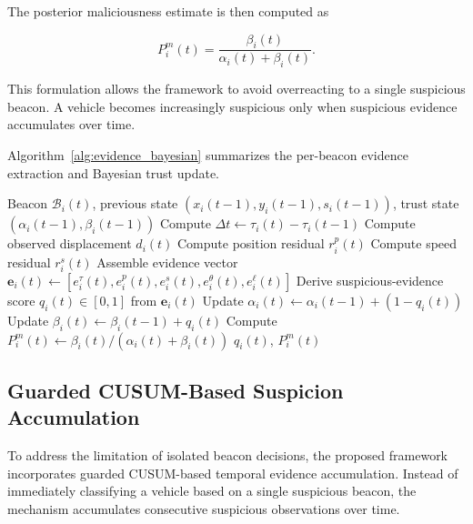\documentclass[journal]{IEEEtran}
\begin{document}
The posterior maliciousness estimate is then computed as

\begin{equation}
P_i^{m}(t)=\frac{\beta_i(t)}{\alpha_i(t)+\beta_i(t)}.
\label{eq:malicious_probability}
\end{equation}

This formulation allows the framework to avoid overreacting to a single suspicious beacon. A vehicle becomes increasingly suspicious only when suspicious evidence accumulates over time.

Algorithm~\ref{alg:evidence_bayesian} summarizes the per-beacon evidence extraction and Bayesian trust update.

\begin{algorithm}[!t]
\caption{Physical-Consistency Evidence Extraction and Bayesian Trust Update}
\label{alg:evidence_bayesian}
\begin{algorithmic}[1]
\REQUIRE Beacon $\mathcal{B}_i(t)$, previous state $(x_i(t-1),y_i(t-1),s_i(t-1))$, trust state $(\alpha_i(t-1),\beta_i(t-1))$
\STATE Compute $\Delta t \leftarrow \tau_i(t)-\tau_i(t-1)$
\STATE Compute observed displacement $d_i(t)$ 
\STATE Compute position residual $r_i^{p}(t)$ 
\STATE Compute speed residual $r_i^{s}(t)$ 
\STATE Assemble evidence vector $\mathbf{e}_i(t) \leftarrow [e_i^{\tau}(t),e_i^{p}(t),e_i^{s}(t),e_i^{\theta}(t),e_i^{\ell}(t)]$
\STATE Derive suspicious-evidence score $q_i(t)\in[0,1]$ from $\mathbf{e}_i(t)$
\STATE Update $\alpha_i(t) \leftarrow \alpha_i(t-1)+(1-q_i(t))$ 
\STATE Update $\beta_i(t) \leftarrow \beta_i(t-1)+q_i(t)$ 
\STATE Compute $P_i^{m}(t) \leftarrow \beta_i(t)/(\alpha_i(t)+\beta_i(t))$
\RETURN $q_i(t)$, $P_i^{m}(t)$
\end{algorithmic}
\end{algorithm}

\subsection{Guarded CUSUM-Based Suspicion Accumulation}
\label{subsec:cusum_accumulation}

To address the limitation of isolated beacon decisions, the proposed
framework incorporates guarded CUSUM-based temporal evidence accumulation.
Instead of immediately classifying a vehicle based on a single suspicious
beacon, the mechanism accumulates consecutive suspicious observations over
time.
\end{document}

